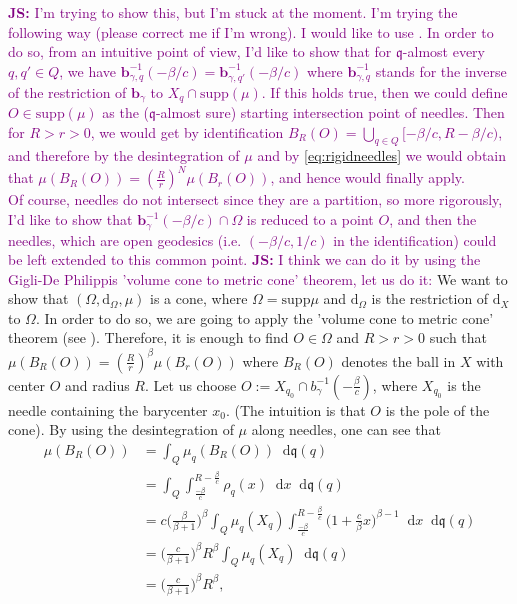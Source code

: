 \documentclass[sts]{imsart}
\theoremstyle{definition}
\theoremstyle{remark}
\newcommand{\bb}{\mathbf{b}}
\newcommand{\fq}{\mathfrak{q}}
\newcommand{\dist}{\mathrm{d}}
\newcommand{\supp}{\mathrm{supp}}
\newcommand*\diff{\mathop{}\!\mathrm{d}}
\newcommand{\js}[1]{\textcolor{purple}{\textbf{JS:}  #1}}
\begin{document}
\js{I'm trying to show this, but I'm stuck at the moment. I'm trying the following way (please correct me if I'm wrong). I would like to use \cite[Theorem 1.1]{de2016volume}. In order to do so, from an intuitive point of view, I'd like to show that for $\fq$-almost every $q,q' \in Q$, we have $\bb_{\gamma,q}^{-1}(-\beta/c)=\bb_{\gamma,q'}^{-1}(-\beta/c)$ where $\bb_{\gamma,q}^{-1}$ stands for the inverse of the restriction of $\bb_{\gamma}$ to $X_q \cap \supp(\mu)$. If this holds true, then we could define $O\in \supp(\mu)$ as the ($\fq$-almost sure) starting intersection point of needles. Then for $R>r>0$, we would get by identification $B_R(O) = \bigcup_{q\in Q} [-\beta/c,R-\beta/c)$, and therefore by the desintegration of $\mu$ and by \eqref{eq:rigidneedles} we would obtain that $\mu(B_R(O)) = \left( \frac{R}{r}\right)^N\mu(B_r(O))$, and hence \cite[Theorem 1.1]{de2016volume} would finally apply.\\
Of course, needles do not intersect since they are a partition, so more rigorously, I'd like to show that $\bb_{\gamma}^{-1}(-\beta/c)\cap \Omega$ is reduced to a point $O$, and then the needles, which are open geodesics (i.e. $(-\beta/c,1/c)$ in the identification) could be left extended to this common point.}
\js{I think we can do it by using the Gigli-De Philippis 'volume cone to metric cone' theorem\cite[Theorem 1.1]{de2016volume}, let us do it:}
We want to show that $\left(\Omega,\dist_\Omega,\mu\right)$ is a cone, where $\Omega =\supp \mu$ and $\dist_\Omega$ is the restriction of $\dist_X$ to $\Omega$. In order to do so, we are going to apply the 'volume cone to metric cone' theorem (see \cite[Theorem 1.1]{de2016volume}). Therefore, it is enough to find $O\in\Omega$ and $R>r>0$ such that $\mu\left(B_R(O)\right) = \left(\frac{R}{r}\right)^\beta \mu\left(B_r(O)\right)$ where $B_R(O)$ denotes the ball in $X$ with center $O$ and radius $R$.
Let us choose $O:=X_{q_0}\cap b_\gamma^{-1}(-\frac{\beta}{c})$, where $X_{q_0}$ is the needle containing the barycenter $x_0$. (The intuition is that $O$ is the pole of the cone). By using the desintegration of $\mu$ along needles, one can see that
\begin{align*}
    \mu\left( B_R(O)\right) &= \int_Q \mu_q\left( B_R(O) \right) \diff\fq(q)\\
    &= \int_Q \int_{\frac{-\beta}{c}}^{R-\frac{\beta}{c}} \rho_q(x)\diff x \diff \fq(q)\\
    &= c \biggl( \frac{\beta}{\beta +1} \biggr)^\beta  \int_Q \mu_q(X_q)\int_{\frac{-\beta}{c}}^{R-\frac{\beta}{c}} \biggl( 1+\frac{c}{\beta}x \biggr)^{\beta -1}\diff x \diff \fq(q)\\
    &=  \biggl( \frac{c}{\beta +1} \biggr)^\beta R^\beta \int_Q \mu_q(X_q) \diff \fq(q)\\
    &=  \biggl( \frac{c}{\beta +1} \biggr)^\beta R^\beta,
\end{align*}
\end{document}
